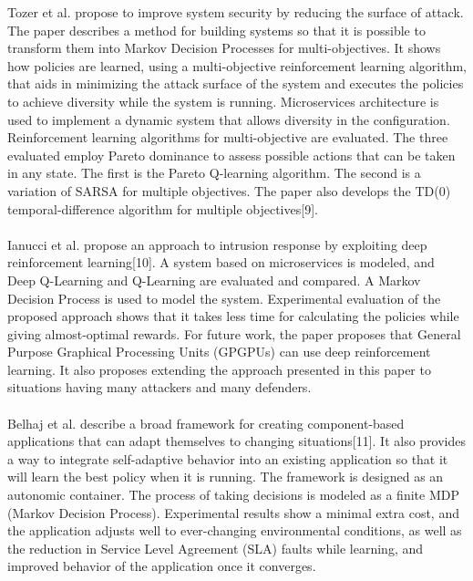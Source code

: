 \documentclass[conference]{IEEEtran}
\begin{document}
Tozer et al. propose to improve system security by reducing the surface of attack. The paper describes a method for building systems so that it is possible to transform them into Markov Decision Processes for multi-objectives. It shows how policies are learned, using a multi-objective reinforcement learning algorithm, that aids in minimizing the attack surface of the system and executes the policies to achieve diversity while the system is running. Microservices architecture is used to implement a dynamic system that allows diversity in the configuration. Reinforcement learning algorithms for multi-objective are evaluated. The three evaluated employ Pareto dominance to assess possible actions that can be taken in any state. The first is the Pareto Q-learning algorithm. The second is a variation of SARSA for multiple objectives. The paper also develops the TD(0) temporal-difference algorithm for multiple objectives[9]. \\ \\

Ianucci et al. propose an approach to intrusion response by exploiting deep reinforcement learning[10]. A system based on microservices is modeled, and Deep Q-Learning and Q-Learning are evaluated and compared. A Markov Decision Process is used to model the system. Experimental evaluation of the proposed approach shows that it takes less time for calculating the policies while giving almost-optimal rewards. For future work, the paper proposes that General Purpose Graphical Processing Units (GPGPUs) can use deep reinforcement learning. It also proposes extending the approach presented in this paper to situations having many attackers and many defenders. \\ \\

Belhaj et al. describe a broad framework for creating component-based applications that can adapt themselves to changing situations[11]. It also provides a way to integrate self-adaptive behavior into an existing application so that it will learn the best policy when it is running. The framework is designed as an autonomic container. The process of taking decisions is modeled as a finite MDP (Markov Decision Process). Experimental results show a minimal extra cost, and the application adjusts well to ever-changing environmental conditions, as well as the reduction in Service Level Agreement (SLA) faults while learning, and improved behavior of the application once it converges. \\ \\
\end{document}
